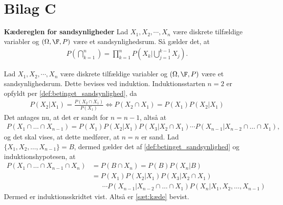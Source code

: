 \section{Bilag C}\label{bilag:kædereglen}
\begin{minipage}\textwidth
\begin{thmx} \textbf{Kædereglen for sandsynligheder} \label{sæt:kæde}%
\newline
Lad $X_1, X_2, \cdots, X_n$ være diskrete tilfældige variabler og $(\Omega, \F, P)$ være et sandsynlighedsrum. Så gælder det, at 
\begin{align*}
    P\left(\bigcap_{k=1}^n\right)=\prod_{k=1}^n P\left(X_k\bigg|\bigcup_{j=1}^{k-1} X_j\right).
\end{align*}
\end{thmx}
\end{minipage}

\begin{bev} \textbf{} %
\newline
Lad $X_1, X_2, \cdots, X_n$ være diskrete tilfældige variabler og $(\Omega, \F, P)$ være et sandsynlighedsrum.
Dette bevises ved induktion. Induktionsstarten $n=2$ er opfyldt per \autoref{def:betinget_sandsynlighed}, da
\begin{align*}
    P(X_2 | X_1) = \frac{P(X_2 \cap X_1)}{P(X_1)} \Leftrightarrow P(X_2 \cap X_1) = P(X_1)P(X_2 | X_1)
\end{align*}
Det antages nu, at det er sandt for $n = n-1$, altså at 
\begin{align*}
    P(X_1 \cap \dots \cap X_{n-1}) = P(X_1)P(X_2|X_1)P(X_3|X_2 \cap X_1) \cdots P(X_{n-1} | X_{n-2} \cap \dots \cap X_1),
\end{align*}
og det skal vises, at dette medfører, at $n=n$ er sand. Lad $\{X_1, X_2, \dots, X_{n-1}\} = B$, dermed gælder det af \autoref{def:betinget_sandsynlighed} og induktionshypotesen, at
\begin{align*}
    P(X_1 \cap \dots \cap X_{n-1} \cap X_n) &= P(B \cap X_n) = P(B)P(X_n | B)\\
    &= P(X_1)P(X_2|X_1)P(X_3|X_2 \cap X_1) \\
    &\phantom{= \ } \cdots P(X_{n-1} | X_{n-2} \cap \dots \cap X_1)P(X_n | X_1, X_2, \dots, X_{n-1})
\end{align*}
Dermed er induktionsskridtet vist. Altså er \autoref{sæt:kæde} bevist.
\end{bev}